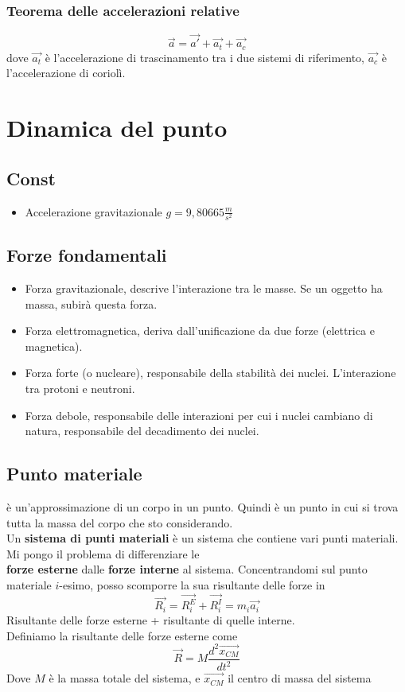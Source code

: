 \documentclass[a4paper]{report}
\begin{document}
  \subsection{Teorema delle accelerazioni relative}
  $$ \vec{a} = \vec{a'} + \vec{a_t} + \vec{a_c}$$
  dove $\vec{a_t}$ è l'accelerazione di trascinamento tra i due sistemi di riferimento, $\vec{a_c}$ è l'accelerazione di coriolì.


  \chapter{Dinamica del punto}

  \section{Const}
  \begin{itemize}
    \item Accelerazione gravitazionale $g = 9,80665 \frac{m}{s^2}$
  \end{itemize}

  \section{Forze fondamentali}
  \begin{itemize}
    \item Forza gravitazionale, descrive l'interazione tra le masse. Se un oggetto ha massa, subirà questa forza.
    \item Forza elettromagnetica, deriva dall'unificazione da due forze (elettrica e magnetica).
    \item Forza forte (o nucleare), responsabile della stabilità dei nuclei. L'interazione tra protoni e neutroni.
    \item Forza debole, responsabile delle interazioni per cui i nuclei cambiano di natura, responsabile del decadimento dei nuclei.
  \end{itemize}

  \section{Punto materiale}
  è un'approssimazione di un corpo in un punto. Quindi è un punto in cui si trova tutta la massa del corpo che sto considerando.\\
  Un \textbf{sistema di punti materiali} è un sistema che contiene vari punti materiali. Mi pongo il problema di differenziare le\\
  \textbf{forze esterne} dalle \textbf{forze interne} al sistema.
  Concentrandomi sul punto materiale $i$-esimo, posso scomporre la sua risultante delle forze in
  $$\vec{R_i} = \vec{R_i^{E}} + \vec{R_i^{I}} =  m_i \vec{a_i}$$
  Risultante delle forze esterne + risultante di quelle interne.\\
  Definiamo la risultante delle forze esterne come
  $$\vec{R} = M \frac{d^2\vec{x_{CM}}}{dt^2}$$
  Dove $M$ è la massa totale del sistema, e $\vec{x_{CM}}$ il centro di massa del sistema
\end{document}
